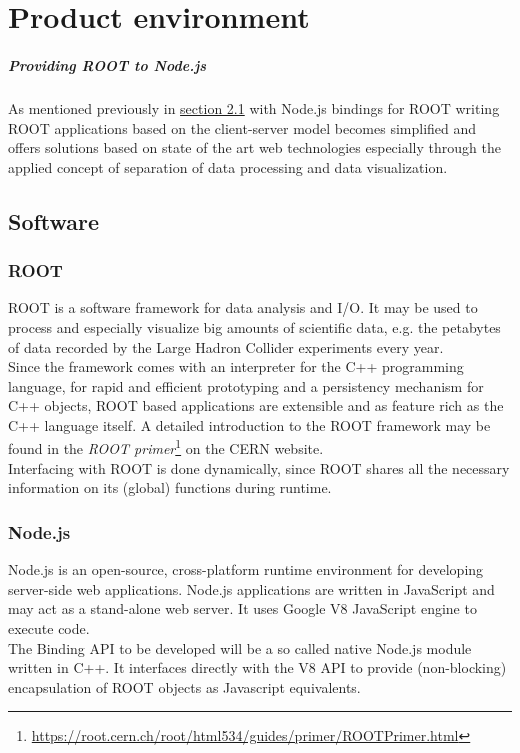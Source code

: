 \chapter{Product environment}

\paragraph{Providing ROOT to Node.js}
As mentioned previously in \hyperlink{section.2.1}{section 2.1} with Node.js bindings for ROOT writing ROOT applications based on the client-server model becomes simplified and offers solutions based on state of the art web technologies especially through the applied concept of separation of data processing and data visualization.

\section{Software}
\subsection{ROOT}
ROOT is a software framework for data analysis and I/O. It may be used to process and especially visualize big amounts of scientific data, e.g. the petabytes of data recorded by the Large Hadron Collider experiments every year.\\
Since the framework comes with an interpreter for the C++ programming language, for rapid and efficient prototyping and a persistency mechanism for C++ objects, ROOT based applications are  extensible and as feature rich as the C++ language itself.
A detailed introduction to the ROOT framework may be found in the \textit{ROOT  primer}\footnote[1]{\url{https://root.cern.ch/root/html534/guides/primer/ROOTPrimer.html}}
on the CERN website.\\
Interfacing with ROOT is done dynamically, since ROOT shares all the necessary information on its (global) functions during runtime.

\subsection{Node.js}
Node.js is an open-source, cross-platform runtime environment for developing server-side web applications. Node.js applications are written in JavaScript and may act as a stand-alone web server. It uses Google V8 JavaScript engine to execute code.\\
The Binding API to be developed will be a so called native Node.js module written in C++. It interfaces directly with the V8 API to provide (non-blocking) encapsulation of ROOT objects as Javascript equivalents.

